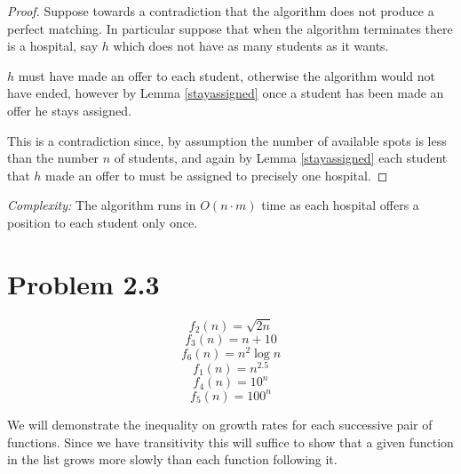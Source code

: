\documentclass{article}
\begin{document}
\begin{proof}
Suppose towards a contradiction that the algorithm does not produce a perfect matching. In particular suppose that when the algorithm terminates there is a hospital, say $h$ which does not have as many students as it wants.

$h$ must have made an offer to each student, otherwise the algorithm would not have ended, however by Lemma \ref{stayassigned} once a student has been made an offer he stays assigned.

This is a contradiction since, by assumption the number of available spots is less than the number $n$ of students, and again by Lemma \ref{stayassigned} each student that $h$ made an offer to must be assigned to precisely one hospital.
\end{proof}

\emph{Complexity:} The algorithm runs in $O(n \cdot m)$ time as each hospital offers a position to each student only once.

\section{Problem 2.3}

\[f_2(n)=\sqrt{2 n}\]
\[f_3(n)=n+10\]
\[f_6(n)=n^2 \log{n}\]
\[f_1(n)=n^{2.5}\]
\[f_4(n)=10^n\]
\[f_5(n)=100^n\]

We will demonstrate the inequality on growth rates for each successive pair of functions. Since we have transitivity this will suffice to show that a given function in the list grows more slowly than each function following it.
\end{document}
